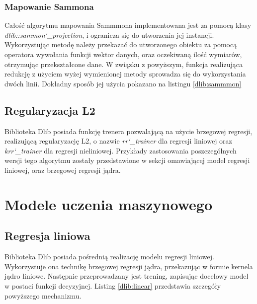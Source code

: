 
\subsubsection{Mapowanie Sammona}

Całość algorytmu mapowania Sammmona implementowana jest za pomocą klasy \textit{dlib::sammon\char`_projection}, i ogranicza się do utworzenia jej instancji. Wykorzystując metodę należy przekazać do utworzonego obiektu za pomocą operatora wywołania funkcji wektor danych, oraz oczekiwaną ilość wymiarów, otrzymując przekształcone dane. W związku z powyższym, funkcja realizująca redukcję z użyciem wyżej wymienionej metody sprowadza się do wykorzystania dwóch linii. Dokładny sposób jej użycia pokazano na listingu \ref{dlib:sammmon}

\subsection{Regularyzacja L2}

Biblioteka Dlib posiada funkcję trenera pozwalającą na użycie brzegowej regresji, realizującą regularyzację L2, o nazwie \textit{rr\char`_trainer} dla regresji liniowej oraz \textit{krr\char`_trainer} dla regresji nieliniowej. Przykłady zastosowania poszczególnych wersji tego algorytmu zostały przedstawione w sekcji omawiającej model regresji liniowej, oraz brzegowej regresji jądra.


\section{Modele uczenia maszynowego}

\subsection{Regresja liniowa}
Biblioteka Dlib posiada pośrednią realizację modelu regresji liniowej. Wykorzystuje ona technikę brzegowej regresji jądra, przekazując w formie kernela jądro liniowe. Następnie przeprowadzany jest trening, zapisując docelowy model w postaci funkcji decyzyjnej. Listing \ref{dlib:linear} przedstawia szczegóły powyższego mechanizmu.


